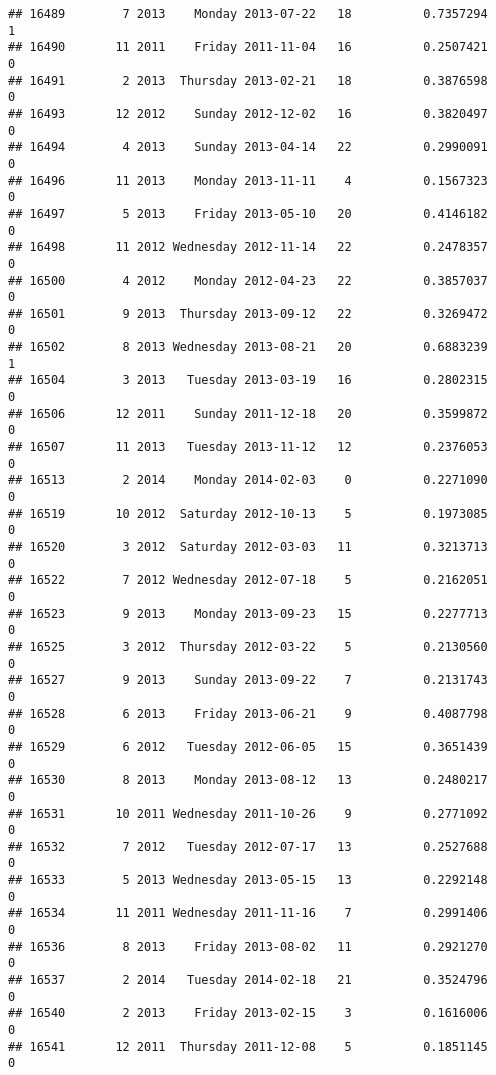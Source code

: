 \documentclass[
]{article}
\begin{document}
\begin{verbatim}
## 16489        7 2013    Monday 2013-07-22   18          0.7357294             1
## 16490       11 2011    Friday 2011-11-04   16          0.2507421             0
## 16491        2 2013  Thursday 2013-02-21   18          0.3876598             0
## 16493       12 2012    Sunday 2012-12-02   16          0.3820497             0
## 16494        4 2013    Sunday 2013-04-14   22          0.2990091             0
## 16496       11 2013    Monday 2013-11-11    4          0.1567323             0
## 16497        5 2013    Friday 2013-05-10   20          0.4146182             0
## 16498       11 2012 Wednesday 2012-11-14   22          0.2478357             0
## 16500        4 2012    Monday 2012-04-23   22          0.3857037             0
## 16501        9 2013  Thursday 2013-09-12   22          0.3269472             0
## 16502        8 2013 Wednesday 2013-08-21   20          0.6883239             1
## 16504        3 2013   Tuesday 2013-03-19   16          0.2802315             0
## 16506       12 2011    Sunday 2011-12-18   20          0.3599872             0
## 16507       11 2013   Tuesday 2013-11-12   12          0.2376053             0
## 16513        2 2014    Monday 2014-02-03    0          0.2271090             0
## 16519       10 2012  Saturday 2012-10-13    5          0.1973085             0
## 16520        3 2012  Saturday 2012-03-03   11          0.3213713             0
## 16522        7 2012 Wednesday 2012-07-18    5          0.2162051             0
## 16523        9 2013    Monday 2013-09-23   15          0.2277713             0
## 16525        3 2012  Thursday 2012-03-22    5          0.2130560             0
## 16527        9 2013    Sunday 2013-09-22    7          0.2131743             0
## 16528        6 2013    Friday 2013-06-21    9          0.4087798             0
## 16529        6 2012   Tuesday 2012-06-05   15          0.3651439             0
## 16530        8 2013    Monday 2013-08-12   13          0.2480217             0
## 16531       10 2011 Wednesday 2011-10-26    9          0.2771092             0
## 16532        7 2012   Tuesday 2012-07-17   13          0.2527688             0
## 16533        5 2013 Wednesday 2013-05-15   13          0.2292148             0
## 16534       11 2011 Wednesday 2011-11-16    7          0.2991406             0
## 16536        8 2013    Friday 2013-08-02   11          0.2921270             0
## 16537        2 2014   Tuesday 2014-02-18   21          0.3524796             0
## 16540        2 2013    Friday 2013-02-15    3          0.1616006             0
## 16541       12 2011  Thursday 2011-12-08    5          0.1851145             0

\end{verbatim}
\end{document}
